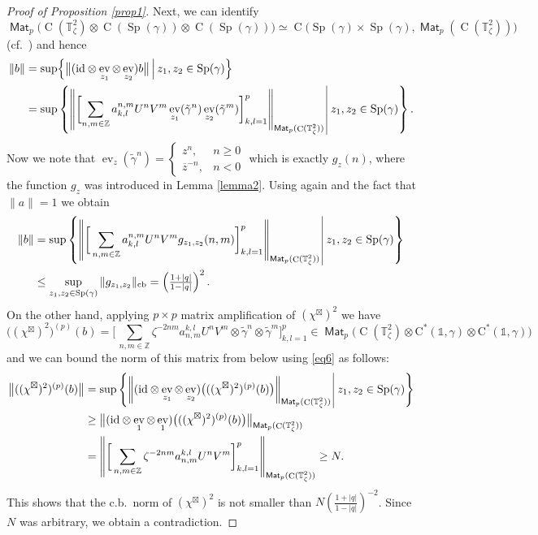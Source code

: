 \documentclass[12pt,reqno,a4paper]{amsart}
\theoremstyle{definition}
\newcommand{\cst}{\ensuremath{\mathrm{C}^*}}
\newcommand{\I}{\mathds{1}}
\newcommand{\id}{\mathrm{id}}
\newcommand{\tens}{\otimes}
\newcommand{\TT}{\mathbb{T}}
\newcommand{\ZZ}{\mathbb{Z}}
\DeclareMathOperator{\C}{C}
\DeclareMathOperator{\Mat}{\mathsf{Mat}}
\DeclareMathOperator{\cb}{cb}
\DeclareMathOperator{\ev}{ev}
\DeclareMathOperator{\Sp}{Sp}
\numberwithin{equation}{section}
\begin{document}
\begin{appendices}
\begin{proof}[Proof of Proposition \ref{prop1}]
Next, we can identify
\[
\Mat_p\bigl(\C(\TT^2_\zeta)\tens\C(\Sp(\gamma))\tens\C(\Sp(\gamma))\bigr)\simeq\C\bigl(\Sp(\gamma)\times \Sp(\gamma),\Mat_p(\C(\TT^2_\zeta))\bigr)
\]
(cf.~\cite[Theorem 6.4.17]{Murphy})
 and hence
\[
\begin{aligned}
\|b\|&=\sup\Bigl\{\bigl\|(\id\tens\ev_{z_1}\tens\ev_{z_2})b\bigr\|\,\Bigr|\Bigl.\,z_1,z_2\in\Sp(\gamma)\Bigr\}\\
&=\sup\left\{
\left\|
 \biggl[
  \sum_{n,m\in\ZZ}a^{n,m}_{k,l}U^nV^m\ev_{z_1}(\tilde{\gamma}^n)\ev_{z_2}(\tilde{\gamma}^m)
 \biggr]_{k,l=1}^{p}
\right\|_{\Mat_p(\C(\TT^2_\zeta))}
\,\vline\,
z_1,z_2\in\Sp(\gamma)
\right\}.
\end{aligned}
\]
Now we note that $\ev_{z}(\tilde{\gamma}^n)=\begin{cases}z^n,&n\ge 0\\ \overline{z}^{-n},& n<0\end{cases}$ which is exactly $g_z(n)$, where the function $g_z$ was introduced in Lemma \ref{lemma2}. Using again \cite[Proposition 7.2]{QuantumTori} and the fact that $\|a\|=1$ we obtain
\[
\begin{aligned}
\|b\|&=\sup
\left\{
 \left\|
 \biggl[\,
 \sum_{n,m\in\ZZ}a^{n,m}_{k,l}U^nV^mg_{z_1,z_2}(n,m)
 \biggr]_{k,l=1}^{p}
 \right\|_{\Mat_p(\C(\TT^2_\zeta))}
\,\vline\,
z_1,z_2\in\Sp(\gamma)
\right\}\\
&\le
\sup_{z_1,z_2\in\Sp(\gamma)}
\|g_{z_1,z_2}\|_{\cb}
=\left(\tfrac{1+|q|}{1-|q|}\right)^2.
\end{aligned}
\]
On the other hand, applying $p\times p$ matrix amplification of $(\chi^{\boxtimes})^2$ we have
\[
\bigl((\chi^{\boxtimes})^2\bigr)^{(p)}(b)
=\biggl[\,
\sum_{n,m\in\ZZ}
\zeta^{-2 nm}a_{n,m}^{k,l}U^nV^m\tens\tilde{\gamma}^n\tens\tilde{\gamma}^m
\biggr]_{k,l=1}^{p}
\!\!\in\Mat_p\bigl(\C(\TT^2_\zeta)\tens\cst(\I,\gamma)\tens\cst(\I,\gamma)\bigr)
\]
and we can bound the norm of this matrix from below using \eqref{eq6} as follows:
\[
\begin{aligned}
\bigl\|((\chi^{\boxtimes})^2)^{(p)}(b)\bigr\|
&=\sup\left\{
\left\|(\id\tens\ev_{z_1}\tens\ev_{z_2})\bigl(((\chi^{\boxtimes})^2)^{(p)}(b)\bigr)
\right\|_{\Mat_p(\C(\TT^2_\zeta))}
\,\vline\,
z_1,z_2\in \Sp(\gamma)
\right\}\\
&\ge 
\bigl\|(\id\tens\ev_{1}\tens\ev_{1})\bigl(((\chi^{\boxtimes})^2)^{(p)}(b)\bigr)
\bigr\|_{\Mat_p(\C(\TT^2_\zeta))}\\
&=\left\|
\biggl[\,
\sum_{n,m\in\ZZ}
\zeta^{-2nm}
a_{n,m}^{k,l}U^n V^m
\biggr]_{k,l=1}^{p}
\right\|_{\Mat_p(\C(\TT^2_\zeta))}\ge N.
\end{aligned}
\]
This shows that the c.b.~norm of $(\chi^\boxtimes)^2$ is not smaller than $N\left(\tfrac{1 +|q|}{1-|q|}\right)^{-2}$. Since $N$ was arbitrary, we obtain a contradiction.
\end{proof}

\end{appendices}
\end{document}
